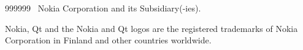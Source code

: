  \begin{slide}{999999}
    \vspace{5em}
    \textcopyright~Nokia Corporation and its Subsidiary(-ies).

    \vspace*{2em}                                                     

    Nokia, Qt and the Nokia and Qt logos are the registered trademarks 
      of Nokia Corporation in Finland and other countries worldwide.
  \end{slide}
